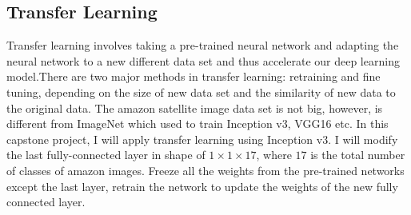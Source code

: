 \documentclass[11pt,oneside,a4paper]{article}
\begin{document}
\begin{multicols}{2}
\subsection{Transfer Learning}
Transfer learning involves taking a pre-trained neural network and adapting the neural network to a new different data set and thus accelerate our deep learning model.There are two major methods in transfer learning: retraining and fine tuning, depending on the size of new data set and the similarity of new data to the original data. The amazon satellite image data set is not big, however, is different from ImageNet which used to train Inception v3, VGG16 etc. In this capstone project, I will apply transfer learning using Inception v3. I will modify the last fully-connected layer in shape of $1\times1\times17$, where $17$ is the total number of classes of amazon images. Freeze all the weights from the pre-trained networks except the last layer, retrain the network to update the weights of the new fully connected layer.







{}








\end{multicols}
\end{document}
